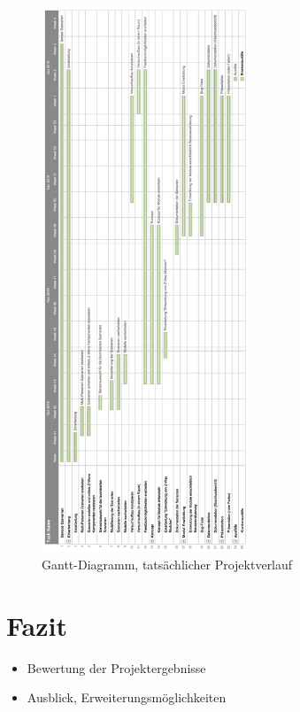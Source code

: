 \documentclass[12pt, oneside, smallheadings]{scrbook}
\begin{document}
\begin{figure}[h!]
	\centering
	\includegraphics[width=0.55\textwidth]{img/Projektverlauf/GanttDiagramm.png}
	\caption{Gantt-Diagramm, tatsächlicher Projektverlauf}
	\label{fig:projektverlaufGanttDiagramm}
\end{figure}



\chapter{Fazit}
\begin{itemize}
	\item Bewertung der Projektergebnisse
	\item Ausblick, Erweiterungsmöglichkeiten
\end{itemize}
\end{document}
